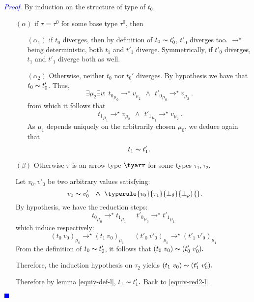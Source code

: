 \documentclass[a4paper,11pt,oneside]{article}
\theoremstyle{plain}
\renewenvironment{proof}{\noindent \begin{adjustwidth}{1.5em}{} \textcolor{blue}{\textit{Proof.}}}
{{\begin{tiny}\textcolor{blue}{$\blacksquare$}\end{tiny}}
\end{adjustwidth}~\\\noindent}
\newcommand{\tmapp}[2]{(#1 ~ #2)}
\newcommand{\ty}[1][]{\tau_{#1}}
\newcommand{\bwedge}{\boldsymbol{~\wedge~}}
\newcommand{\bth}{\bot_\theta}
\newcommand{\brh}{\bot_\rho}
\newcommand{\evalstar}[4]{~#1_{\mu_#2} \rightarrow^{\star} #3_{\mu_#4} ~}
\newcommand{\eqv}[1]{#1 \thicksim #1'}
\begin{document}
	\begin{proof}
		By induction on the structure of type of $t_0$. 
		\begin{itemize}
		\item[$(\alpha)$] if $\ty = \ty^0$ for some base type $\ty^0$, then
		
			\begin{itemize}
			\item[$(\alpha_1)$] if $t_0$ diverges, then by definition of 
			$\eqv{t_0}$, $t'_0$ diverges too. $\rightarrow^\star$ being 
			deterministic, both $t_1$ and $t'_1$ diverge. Symmetrically, if 
			$t'_0$ diverges, $t_1$ and $t'_1$ diverge both as well. 
						
			\item[$(\alpha_2)$] Otherwise, neither $t_0$ nor $t_{0}'$ diverges. 
			 By hypothesis we have that $\eqv{t_0}$. Thus,  
					$$ \exists \mu_2 \exists v: 
					\evalstar{{t_0}}{0}{v}{2} \bwedge \evalstar{{t'_0}}{0}{v}{2}.$$
				from which it follows that 
					$$\evalstar{{t_1}}{1}{v}{2} \bwedge \evalstar{{t'_1}}{1}{v}{2}.$$
				As $\mu_1$ depends uniquely on the arbitrarily chosen 
				$\mu_0$, we deduce again that $$\eqv{t_1}.$$					
			\end{itemize}			
			
		\item[$(\beta)$] Otherwise $\ty$ is an arrow type $\tyarr$ for some types 
		$\ty[1], \ty[2]$.	
		
		Let $v_0, v'_0$ be two arbitrary values satisfying:
		$$~\eqv{v_0}~\bwedge \typerule{v_0}{\ty[1]}{\bth}{\brh}{}.$$
		By hypothesis, we have the reduction steps:
		$$\evalstar{{t_0}}{0}{{t_1}}{1}\quad\evalstar{{t'_0}}{0}{{t'_1}}{1}$$						which induce respectively: 
		$$\evalstar{\tmapp{t_0}{v_0}}{0}{\tmapp{t_1}{v_0}}{1} \quad
		\evalstar{\tmapp{t'_0}{v'_0}}{0}{\tmapp{t'_1}{v'_0}}{1}$$	
		From the definition of $\eqv{t_0}$, it follows that
		${\tmapp{t_0}{v_0}} \thicksim {\tmapp{t'_0}{v'_0}}.$
		
		Therefore, the induction hypothesis on $\ty[2]$ yields 
		${\tmapp{t_1}{v_0}}\thicksim{\tmapp{t'_1}{v'_0}}.$
		
		Therefore by lemma \ref{equiv-def-l},
		$\eqv{t_1}.$ Back to \ref{equiv-red2-l}.	
		\end{itemize}	
	\end{proof}		
	
\end{document}
